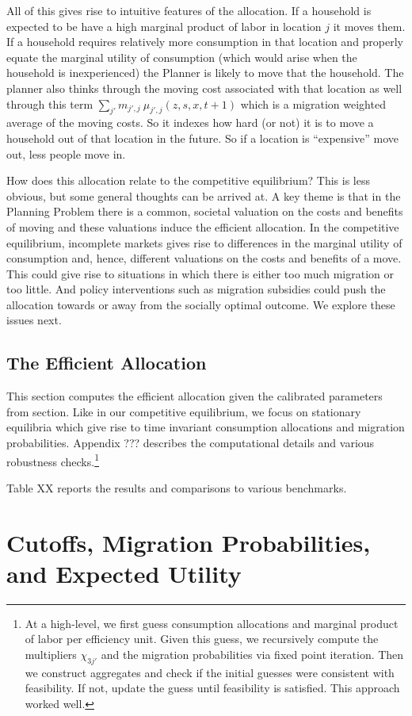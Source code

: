 \documentclass[12pt,pdftex]{article}
\begin{document}
\begin{onehalfspacing}
All of this gives rise to intuitive features of the allocation. If a household is expected to be have a high marginal product of labor in location $j$ it moves them. If a household requires relatively more consumption in that location and properly equate the marginal utility of consumption (which would arise when the household is inexperienced) the Planner is likely to move that the household. The planner also thinks through the moving cost associated with that location as well through this term $\sum_{j'}  m_{j',j} \ \mu_{j',j}(z, s, x, t+1)$ which is a migration weighted average of the moving costs. So it indexes how hard (or not) it is to move a household out of that location in the future. So if a location is ``expensive'' move out, less people move in.

How does this allocation relate to the competitive equilibrium? This is less obvious, but some general thoughts can be arrived at. A key theme is that in the Planning Problem there is a common, societal valuation on the costs and benefits of moving and these valuations induce the efficient allocation. In the competitive equilibrium, incomplete markets gives rise to differences in the marginal utility of consumption and, hence, different valuations on the costs and benefits of a move. This could give rise to situations in which there is either too much migration or too little. And policy interventions such as migration subsidies could push the allocation towards or away from the socially optimal outcome. We explore these issues next.


\subsection{The Efficient Allocation}

This section computes the efficient allocation given the calibrated parameters from section. Like in our competitive equilibrium, we focus on stationary equilibria which give rise to time invariant consumption allocations and migration probabilities. Appendix ??? describes the computational details and various robustness checks.\footnote{At a high-level, we first guess consumption allocations and marginal product of labor per efficiency unit. Given this guess, we recursively compute the multipliers $\chi_{3j'}$ and the migration probabilities via fixed point iteration. Then we construct aggregates and check if the initial guesses were consistent with feasibility. If not, update the guess until feasibility is satisfied. This approach worked well.}

Table XX reports the results and comparisons to various benchmarks. 


\newpage



\newpage

\appendix

\section{Cutoffs, Migration Probabilities, and Expected Utility}\label{appendix:migration_probs}




\end{onehalfspacing}
\end{document}
